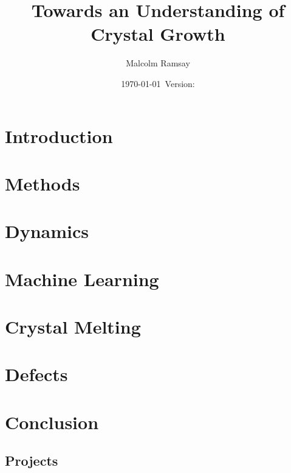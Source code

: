 \documentclass[12pt, a4paper]{report}
\title{Towards an Understanding of Crystal Growth}
\author{Malcolm Ramsay}
\date{\today{}~Version: \version}
\begin{document}
\beforepreface{}
\afterpreface{}

\chapter{Introduction}







\chapter{Methods}






\chapter{Dynamics}




\chapter{Machine Learning}




\chapter{Crystal Melting}




\chapter{Defects}




\chapter{Conclusion}

\printbibliography{}

\begin{appendices}
  \chapter{Projects}
  

\end{appendices}
\end{document}
